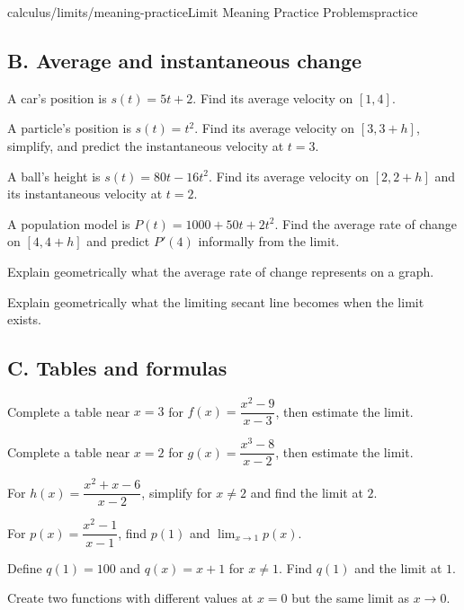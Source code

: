 \begin{webpage}{calculus/limits/meaning-practice}{Limit Meaning Practice Problems}{practice}
\subsection*{B. Average and instantaneous change}

\begin{bgexercises}[label=\textbf{1.\arabic*},resume]
  \item A car's position is \(s(t)=5t+2\). Find its average velocity on \([1,4]\).
  \item A particle's position is \(s(t)=t^2\). Find its average velocity on \([3,3+h]\), simplify, and predict the instantaneous velocity at \(t=3\).
  \item A ball's height is \(s(t)=80t-16t^2\). Find its average velocity on \([2,2+h]\) and its instantaneous velocity at \(t=2\).
  \item A population model is \(P(t)=1000+50t+2t^2\). Find the average rate of change on \([4,4+h]\) and predict \(P'(4)\) informally from the limit.
  \item Explain geometrically what the average rate of change represents on a graph.
  \item Explain geometrically what the limiting secant line becomes when the limit exists.
\end{bgexercises}

\subsection*{C. Tables and formulas}

\begin{bgexercises}[label=\textbf{1.\arabic*},resume]
  \item Complete a table near \(x=3\) for \(f(x)=\dfrac{x^2-9}{x-3}\), then estimate the limit.
  \item Complete a table near \(x=2\) for \(g(x)=\dfrac{x^3-8}{x-2}\), then estimate the limit.
  \item For \(h(x)=\dfrac{x^2+x-6}{x-2}\), simplify for \(x\ne2\) and find the limit at \(2\).
  \item For \(p(x)=\dfrac{x^2-1}{x-1}\), find \(p(1)\) and \(\lim_{x\to1}p(x)\).
  \item Define \(q(1)=100\) and \(q(x)=x+1\) for \(x\ne1\). Find \(q(1)\) and the limit at \(1\).
  \item Create two functions with different values at \(x=0\) but the same limit as \(x\to0\).
\end{bgexercises}


\end{webpage}
